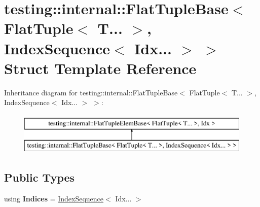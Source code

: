 \hypertarget{structtesting_1_1internal_1_1FlatTupleBase_3_01FlatTuple_3_01T_8_8_8_01_4_00_01IndexSequence_3_01Idx_8_8_8_01_4_01_4}{}\section{testing\+:\+:internal\+:\+:Flat\+Tuple\+Base$<$ Flat\+Tuple$<$ T... $>$, Index\+Sequence$<$ Idx... $>$ $>$ Struct Template Reference}
\label{structtesting_1_1internal_1_1FlatTupleBase_3_01FlatTuple_3_01T_8_8_8_01_4_00_01IndexSequence_3_01Idx_8_8_8_01_4_01_4}
Inheritance diagram for testing\+:\+:internal\+:\+:Flat\+Tuple\+Base$<$ Flat\+Tuple$<$ T... $>$, Index\+Sequence$<$ Idx... $>$ $>$\+:\begin{figure}[H]
\begin{center}
\leavevmode
\includegraphics[height=2.000000cm]{structtesting_1_1internal_1_1FlatTupleBase_3_01FlatTuple_3_01T_8_8_8_01_4_00_01IndexSequence_3_01Idx_8_8_8_01_4_01_4}
\end{center}
\end{figure}
\subsection*{Public Types}
\begin{DoxyCompactItemize}
\item 
\mbox{\label{structtesting_1_1internal_1_1FlatTupleBase_3_01FlatTuple_3_01T_8_8_8_01_4_00_01IndexSequence_3_01Idx_8_8_8_01_4_01_4_ada1941ebde1ec1c844b72970e0ccb304}} 
using {\bfseries Indices} = \mbox{\hyperlink{structtesting_1_1internal_1_1IndexSequence}{Index\+Sequence}}$<$ Idx... $>$
\end{DoxyCompactItemize}
